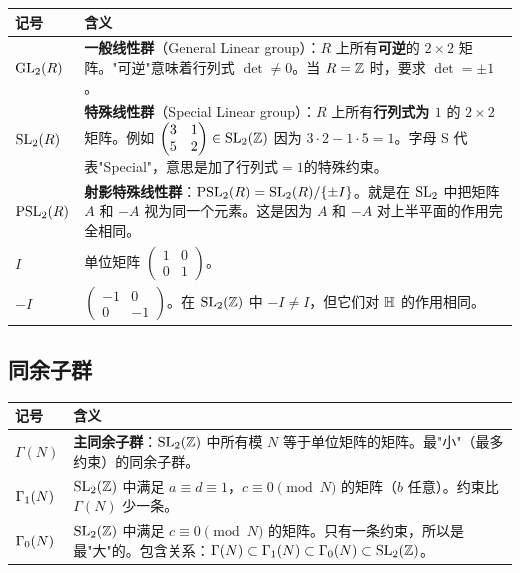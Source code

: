 \begin{longtable}{@{}p{3.5cm}p{10cm}@{}}
\toprule
\textbf{记号} & \textbf{含义} \\
\midrule
$\mathrm{GL}_2(R)$ &
  \textbf{一般线性群}（General Linear group）：$R$ 上所有\textbf{可逆}的 $2\times 2$ 矩阵。"可逆"意味着行列式 $\det \neq 0$。当 $R = \mathbb{Z}$ 时，要求 $\det = \pm 1$。 \\[4pt]
$\mathrm{SL}_2(R)$ &
  \textbf{特殊线性群}（Special Linear group）：$R$ 上所有\textbf{行列式为 $1$} 的 $2\times 2$ 矩阵。例如 $\begin{pmatrix} 3 & 1 \\ 5 & 2 \end{pmatrix} \in \mathrm{SL}_2(\mathbb{Z})$ 因为 $3 \cdot 2 - 1 \cdot 5 = 1$。字母 S 代表"Special"，意思是加了行列式$=1$的特殊约束。 \\[4pt]
$\mathrm{PSL}_2(R)$ &
  \textbf{射影特殊线性群}：$\mathrm{PSL}_2(R) = \mathrm{SL}_2(R) / \{\pm I\}$。就是在 $\mathrm{SL}_2$ 中把矩阵 $A$ 和 $-A$ 视为同一个元素。这是因为 $A$ 和 $-A$ 对上半平面的作用完全相同。 \\[4pt]
$I$ &
  单位矩阵 $\begin{pmatrix} 1 & 0 \\ 0 & 1 \end{pmatrix}$。 \\[4pt]
$-I$ &
  $\begin{pmatrix} -1 & 0 \\ 0 & -1 \end{pmatrix}$。在 $\mathrm{SL}_2(\mathbb{Z})$ 中 $-I \neq I$，但它们对 $\mathbb{H}$ 的作用相同。 \\
\bottomrule
\end{longtable}

\subsection*{同余子群}

\begin{longtable}{@{}p{3.5cm}p{10cm}@{}}
\toprule
\textbf{记号} & \textbf{含义} \\
\midrule
$\Gamma(N)$ &
  \textbf{主同余子群}：$\mathrm{SL}_2(\mathbb{Z})$ 中所有模 $N$ 等于单位矩阵的矩阵。最"小"（最多约束）的同余子群。 \\[4pt]
$\Gamma_1(N)$ &
  $\mathrm{SL}_2(\mathbb{Z})$ 中满足 $a \equiv d \equiv 1$，$c \equiv 0 \pmod{N}$ 的矩阵（$b$ 任意）。约束比 $\Gamma(N)$ 少一条。 \\[4pt]
$\Gamma_0(N)$ &
  $\mathrm{SL}_2(\mathbb{Z})$ 中满足 $c \equiv 0 \pmod{N}$ 的矩阵。只有一条约束，所以是最"大"的。包含关系：$\Gamma(N) \subset \Gamma_1(N) \subset \Gamma_0(N) \subset \mathrm{SL}_2(\mathbb{Z})$。 \\
\bottomrule
\end{longtable}

